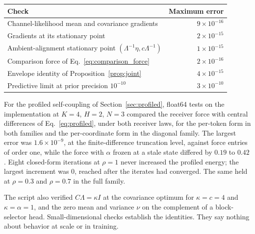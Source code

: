 \documentclass[11pt]{article}
\theoremstyle{definition}
\theoremstyle{remark}
\begin{document}
\begin{center}
\small
\begin{tabular}{@{}lr@{}}
\toprule
Check & Maximum error \\
\midrule
Channel-likelihood mean and covariance gradients & $9\times10^{-16}$ \\
Gradients at its stationary point & $2\times10^{-15}$ \\
Ambient-alignment stationary point $(\Lambda^{-1}\eta,c\Lambda^{-1})$ & $1\times10^{-15}$ \\
Comparison force of Eq.~\eqref{eq:comparison_force} & $2\times10^{-16}$ \\
Envelope identity of Proposition~\ref{prop:joint} & $4\times10^{-15}$ \\
Predictive limit at prior precision $10^{-10}$ & $3\times10^{-10}$ \\
\bottomrule
\end{tabular}
\end{center}

For the profiled self-coupling of Section~\ref{sec:profiled}, float64 tests on the implementation at $K=4$, $H=2$, $N=3$ compared the receiver force with central differences of Eq.~\eqref{eq:profiled}, under both receiver laws, for the per-token form in both families and the per-coordinate form in the diagonal family. The largest error was $1.6\times10^{-9}$, at the finite-difference truncation level, against force entries of order one, while the force with $\alpha$ frozen at a stale state differed by $0.19$ to $0.42$. Eight closed-form iterations at $\rho=1$ never increased the profiled energy; the largest increment was $0$, reached after the iterates had converged. The same held at $\rho=0.3$ and $\rho=0.7$ in the full family.

The script also verified $C\Lambda=\kappa I$ at the covariance optimum for $\kappa=c=4$ and $\kappa=\alpha=1$, and the zero mean and variance $\nu$ on the complement of a block-selector head. Small-dimensional checks establish the identities. They say nothing about behavior at scale or in training.
\end{document}
